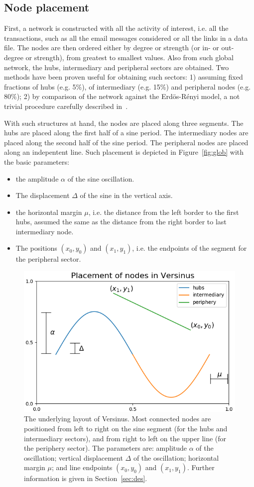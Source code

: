 \documentclass[runningheads]{llncs}
\begin{document}
\subsection{Node placement}
First, a network is constructed with all the activity of interest, i.e. all the transactions, such as all the email messages considered or all the links in a data file.
The nodes are then ordered either by degree or strength (or in- or out- degree or strength), from greatest to smallest values.
Also from such global network, the hubs, intermediary and peripheral sectors are obtained. Two methods have been proven useful for obtaining such sectors: 1) assuming fixed fractions of hubs (e.g. 5\%), of intermediary (e.g. 15\%) and peripheral nodes (e.g. 80\%); 2) by comparison of the network against the Erdös-Rényi model, a not trivial procedure carefully described in~\cite{stab}.

With such structures at hand, the nodes are placed along three segments.
The hubs are placed along the first half of a sine period.
The intermediary nodes are placed along the second half of the sine period.
The peripheral nodes are placed along an indepentent line.
Such placement is depicted in Figure~\ref{fig:glob} with
the basic parameters:
\begin{itemize}
  \item the amplitude $\alpha$ of the sine oscillation.
  \item The displacement $\Delta$ of the sine in the vertical axis.
  \item the horizontal margin $\mu$, i.e. the distance from the left border to the first hubs, assumed the same as the distance from the right border to last intermediary node.
  \item The positions $(x_0,y_0)$ and $(x_1,y_1)$, i.e. the endpoints of the segment for the peripheral sector.
\end{itemize}

\begin{figure}[!h]\centering
\includegraphics[width=.7\textwidth]{nodePositioning}
  \caption{The underlying layout of Versinus. Most connected nodes are positioned from left to right on the sine segment (for the hubs and intermediary sectors), and from right to left on the upper line (for the periphery sector). The parameters are: amplitude $\alpha$ of the oscillation; vertical displacement $\Delta$ of the oscillation; horizontal margin $\mu$; and line endpoints $(x_0, y_0)$ and $(x_1, y_1)$.
   Further information is given in Section~\ref{sec:des}.
  }\label{fig1}
\end{figure}
\end{document}
